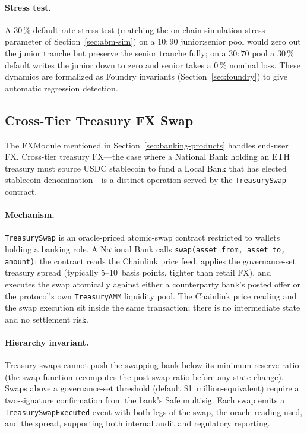 \documentclass[12pt,a4paper]{report}
\begin{document}
\paragraph{Stress test.}
A 30\,\% default-rate stress test (matching the on-chain simulation stress parameter of Section~\ref{sec:abm-sim}) on a $10:90$ junior:senior pool would zero out the junior tranche but preserve the senior tranche fully; on a $30:70$ pool a 30\,\% default writes the junior down to zero and senior takes a 0\,\% nominal loss. These dynamics are formalized as Foundry invariants (Section~\ref{sec:foundry}) to give automatic regression detection.

\subsection{Cross-Tier Treasury FX Swap}
\label{sec:treasury-fx}

The FXModule mentioned in Section~\ref{sec:banking-products} handles end-user FX. Cross-tier treasury FX---the case where a National Bank holding an ETH treasury must source USDC stablecoin to fund a Local Bank that has elected stablecoin denomination---is a distinct operation served by the \texttt{TreasurySwap} contract.

\paragraph{Mechanism.}
\texttt{TreasurySwap} is an oracle-priced atomic-swap contract restricted to wallets holding a banking role. A National Bank calls \texttt{swap(asset\_from, asset\_to, amount)}; the contract reads the Chainlink price feed, applies the governance-set treasury spread (typically 5--10~basis points, tighter than retail FX), and executes the swap atomically against either a counterparty bank's posted offer or the protocol's own \texttt{TreasuryAMM} liquidity pool. The Chainlink price reading and the swap execution sit inside the same transaction; there is no intermediate state and no settlement risk.

\paragraph{Hierarchy invariant.}
Treasury swaps cannot push the swapping bank below its minimum reserve ratio (the swap function recomputes the post-swap ratio before any state change). Swaps above a governance-set threshold (default \$1~million-equivalent) require a two-signature confirmation from the bank's Safe multisig. Each swap emits a \texttt{TreasurySwapExecuted} event with both legs of the swap, the oracle reading used, and the spread, supporting both internal audit and regulatory reporting.
\end{document}
